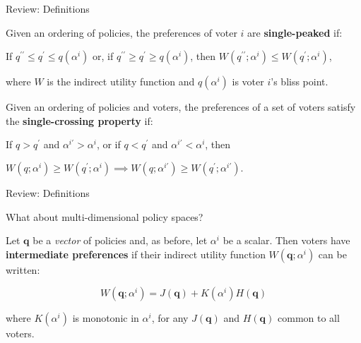\documentclass[aspectratio=169]{beamer}
\begin{document}
\begin{frame}{Review: Definitions}

\begin{tcolorbox}
Given an ordering of policies, the preferences of voter $i$ are \textbf{single-peaked} if:
\vspace{1em}

If $q^{\prime\prime} \leq q^\prime \leq q(\alpha^i) $ or, if $q^{\prime\prime} \geq q^\prime \geq q(\alpha^i) $, then $W(q^{\prime \prime}; \alpha^i) \leq W(q^\prime; \alpha^i)$,

\vspace{1em} where $W$ is the indirect utility function and $q(\alpha^i)$ is voter $i$'s bliss point.

\end{tcolorbox}

\pause 

\begin{tcolorbox}
Given an ordering of policies and voters, the preferences of a set of voters satisfy the \textbf{single-crossing property} if:
\vspace{1em}

If $q>q^\prime$ and $\alpha^{i \prime} > \alpha^i$, or if $q<q^\prime$ and $\alpha^{i \prime} < \alpha^i$, then 

\vspace{0.5em} $W(q; \alpha^i) \geq W(q^\prime; \alpha^i) \implies W(q; \alpha^{i \prime}) \geq W(q^\prime ; \alpha^{i \prime}).$

\end{tcolorbox}


\end{frame}
\begin{frame}{Review: Definitions}

\begin{Large}
What about multi-dimensional policy spaces? 
\end{Large}

\vspace{1em}

\begin{tcolorbox}
Let $\bm{q}$ be a \textit{vector} of policies and, as before, let $\alpha^i$ be a scalar. Then voters have \textbf{intermediate preferences} if their indirect utility function $W( \bm{q}; \alpha^i)$ can be written:

$$ W( \bm{q}; \alpha^i) = J(\bm{q}) + K(\alpha^i) H(\bm{q}) $$ 

\vspace{0.5em} 
where $K(\alpha^i)$ is monotonic in $\alpha^i$, for any $J(\bm{q})$ and $H(\bm{q})$ common to all voters.
\end{tcolorbox}
\end{frame}
\end{document}
